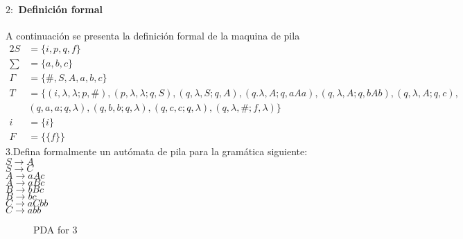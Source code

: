 \documentclass[10pt,a4paper]{book}
\begin{document}
{\paragraph{$2:$ Definición formal}A continuación se presenta la definición formal de la maquina de pila\\[0.2cm]
\begin{alignat*}{2}
	S&= \{i, p,q,f\}\\
	\textstyle \sum&= \{a,b,c\}\\
	\Gamma&=\{\#,S,A,a,b,c\}\\
	T&=\{(i,\lambda,\lambda;p,\#),(p,\lambda,\lambda;q,S),(q,\lambda,S;q,A) , (q.\lambda,A;q,aAa),(q,\lambda,A;q,bAb),(q,\lambda,A;q,c),\\&(q,a,a;q,\lambda),(q,b,b;q,\lambda),(q,c,c;q,\lambda),(q,\lambda,\#;f,\lambda)\}\\
	i&=\{i\}\\
	F&=\{\{f\}\}
\end{alignat*}
3.Defina formalmente un autómata de pila para la gramática siguiente:\\[1cm]
$S \rightarrow A$\\
$S \rightarrow C$\\
$A \rightarrow aAc$\\
$A \rightarrow aBc$\\
$B \rightarrow bBc$\\
$B \rightarrow bc$\\
$C \rightarrow aCbb$\\
$C \rightarrow abb$\\
\begin{figure*}[h!]
	\caption{PDA for 3}
\end{figure*}
}
\end{document}
